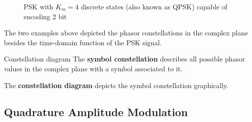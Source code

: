 \begin{refsection}
\begin{figure}[H]
{
	}
	
	\caption{\acs{PSK} with $K_m = 4$ discrete states (also known as \ac{QPSK}) capable of encoding 2 bit}
\end{figure}

The two examples above depicted the phasor constellations in the complex plane besides the time-domain function of the \ac{PSK} signal.

\begin{definition}{Constellation diagram}
	The  \textbf{symbol constellation} describes all possible phasor values in the complex plane with a symbol associated to it.
	
	The  \textbf{constellation diagram} depicts the symbol constellation graphically.
\end{definition}

\subsection{Quadrature Amplitude Modulation}


\end{refsection}

